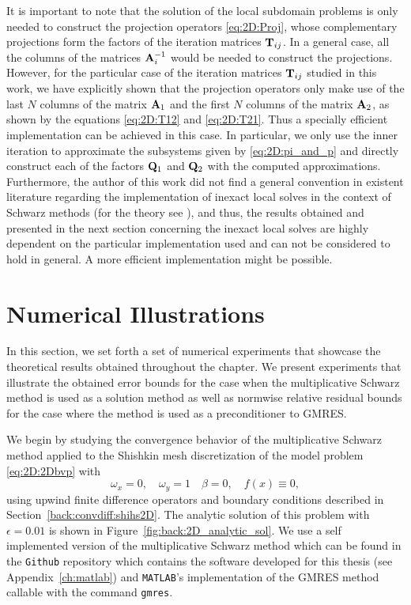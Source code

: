 It is important to note that the solution of the local subdomain problems is
only needed to construct the projection operators \eqref{eq:2D:Proj}, whose
complementary projections form the factors of the iteration matrices $\mathbf{T}_{ij}$.
In a general case, all the columns of the matrices $\mathbf{A}_{i}^{-1}$ would be
needed to construct the projections. However, for the particular case of the iteration matrices $\mathbf{T}_{ij}$ studied in this work, we have explicitly shown that the projection operators only make use of the last
$N$ columns of the matrix $\mathbf{A}_1$ and the first $N$ columns of the matrix
$\mathbf{A}_2$, as shown by the equations \eqref{eq:2D:T12} and
\eqref{eq:2D:T21}. Thus a specially efficient implementation can be achieved in this case. In particular, we only use the inner iteration to approximate
the subsystems given by \eqref{eq:2D:pi_and_p} and directly construct each of
the factors $\mathbf{Q}_1$ and $\mathbf{Q}_2$ with the computed approximations. Furthermore,
the author of this work did not find a general convention in existent
literature regarding the implementation of inexact local solves in the context
of Schwarz methods (for the theory see \cite{BenFroNabSzy01}), and thus, the
results obtained and presented in the next section concerning the inexact local
solves are highly dependent on the particular implementation used and can not
be considered to hold in general. A more efficient implementation might be
possible.

\section{Numerical Illustrations}
\label{2D:numerics}

In this section, we set forth a set of numerical experiments that showcase the
theoretical results obtained throughout the chapter. We present experiments
that illustrate the obtained error bounds for the case when the multiplicative
Schwarz method is used as a solution method as well as normwise relative
residual bounds for the case where the method is used as a preconditioner to
GMRES.

We begin by studying the convergence behavior of the multiplicative Schwarz
method applied to the Shishkin mesh discretization of the model problem
\eqref{eq:2D:2Dbvp} with
\[
\omega_x=0,\quad \omega_y=1\quad\beta=0,\quad f(x)\equiv 0,
\]
using upwind finite difference operators and boundary conditions
described in Section~\ref{back:convdiff:shihs2D}. The analytic solution of this
problem with $\epsilon=0.01$ is shown in Figure~\ref{fig:back:2D_analytic_sol}.
We use a self implemented version of the multiplicative Schwarz method which
can be found in the \texttt{Github} repository which contains the software
developed for this thesis (see Appendix~\ref{ch:matlab}) and \texttt{MATLAB}'s
implementation of the GMRES method callable with the command \texttt{gmres}.

